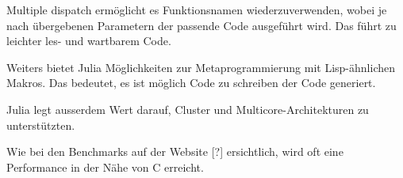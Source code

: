 Multiple dispatch ermöglicht es Funktionsnamen wiederzuverwenden, wobei je nach übergebenen Parametern der passende Code ausgeführt wird. 
Das führt zu leichter les- und wartbarem Code. 

Weiters bietet Julia Möglichkeiten zur Metaprogrammierung mit Lisp-ähnlichen Makros. Das bedeutet, es ist möglich Code zu schreiben der Code generiert.

Julia legt ausserdem Wert darauf, Cluster und Multicore-Architekturen zu unterstützten. 

Wie bei den Benchmarks auf der Website [?] ersichtlich, wird oft eine Performance in der Nähe von C erreicht.
